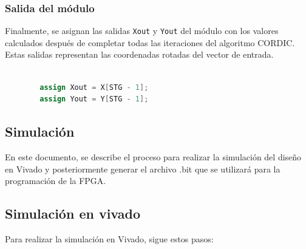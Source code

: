 \documentclass[12pt,a4paper, twoside]{article} %
\begin{document}
\subsubsection{Salida del módulo}

Finalmente, se asignan las salidas \texttt{Xout} y \texttt{Yout} del módulo con los valores calculados después de completar todas las iteraciones del algoritmo CORDIC. Estas salidas representan las coordenadas rotadas del vector de entrada.

\begin{lstlisting}[language=Verilog]

        assign Xout = X[STG - 1];
        assign Yout = Y[STG - 1];

\end{lstlisting}



\subsection{Simulación}
\label{sec:orgdaca22c}


En este documento, se describe el proceso para realizar la simulación del diseño en Vivado y posteriormente generar el archivo .bit que se utilizará para la programación de la FPGA.

\subsection{Simulación en vivado}

Para realizar la simulación en Vivado, sigue estos pasos:
\end{document}
